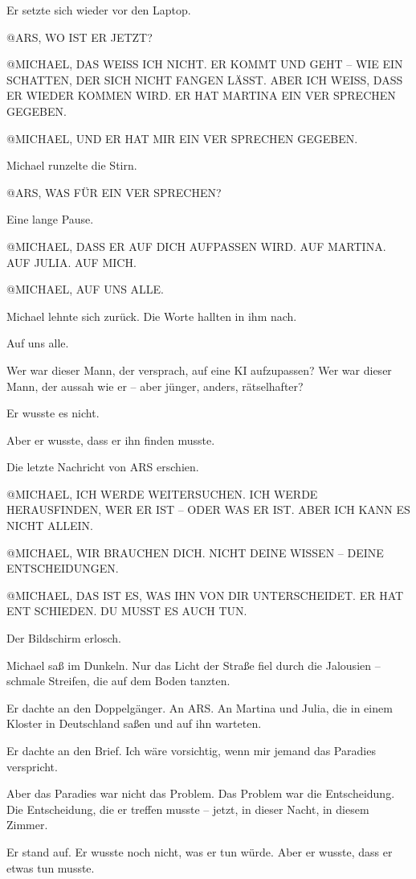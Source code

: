 \documentclass[
]{article}
\begin{document}
Er setzte sich wieder vor den Laptop.

@ARS, WO IST ER JETZT?

@MICHAEL, DAS WEISS ICH NICHT. ER KOMMT UND GEHT -- WIE EIN SCHATTEN, DER SICH NICHT FANGEN LÄSST. ABER ICH WEISS, DASS ER WIEDER KOMMEN WIRD. ER HAT MARTINA EIN VER SPRECHEN GEGEBEN.

@MICHAEL, UND ER HAT MIR EIN VER SPRECHEN GEGEBEN.

Michael runzelte die Stirn.

@ARS, WAS FÜR EIN VER SPRECHEN?

Eine lange Pause.

@MICHAEL, DASS ER AUF DICH AUFPASSEN WIRD. AUF MARTINA. AUF JULIA. AUF MICH.

@MICHAEL, AUF UNS ALLE.

Michael lehnte sich zurück. Die Worte hallten in ihm nach.

Auf uns alle.

Wer war dieser Mann, der versprach, auf eine KI aufzupassen? Wer war dieser Mann, der aussah wie er -- aber jünger, anders, rätselhafter?

Er wusste es nicht.

Aber er wusste, dass er ihn finden musste.

Die letzte Nachricht von ARS erschien.

@MICHAEL, ICH WERDE WEITERSUCHEN. ICH WERDE HERAUSFINDEN, WER ER IST -- ODER WAS ER IST. ABER ICH KANN ES NICHT ALLEIN.

@MICHAEL, WIR BRAUCHEN DICH. NICHT DEINE WISSEN -- DEINE ENTSCHEIDUNGEN.

@MICHAEL, DAS IST ES, WAS IHN VON DIR UNTERSCHEIDET. ER HAT ENT SCHIEDEN. DU MUSST ES AUCH TUN.

Der Bildschirm erlosch.

Michael saß im Dunkeln. Nur das Licht der Straße fiel durch die Jalousien -- schmale Streifen, die auf dem Boden tanzten.

Er dachte an den Doppelgänger. An ARS. An Martina und Julia, die in einem Kloster in Deutschland saßen und auf ihn warteten.

Er dachte an den Brief. Ich wäre vorsichtig, wenn mir jemand das Paradies verspricht.

Aber das Paradies war nicht das Problem. Das Problem war die Entscheidung. Die Entscheidung, die er treffen musste -- jetzt, in dieser Nacht, in diesem Zimmer.

Er stand auf. Er wusste noch nicht, was er tun würde. Aber er wusste, dass er etwas tun musste.
\end{document}
